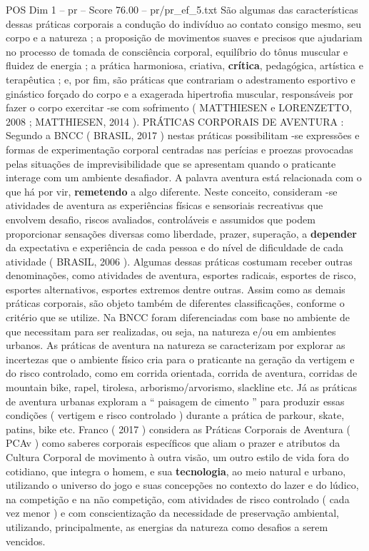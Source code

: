 \begin{textsample}{POS Dim 1 – pr – Score 76.00 – pr/pr\_ef\_5.txt}
São algumas das características dessas práticas corporais a condução do indivíduo ao contato consigo mesmo, seu corpo e a natureza ; a proposição de movimentos suaves e precisos que ajudariam no processo de tomada de consciência corporal, equilíbrio do tônus muscular e fluidez de energia ; a prática harmoniosa, criativa, \textbf{crítica}, pedagógica, artística e terapêutica ; e, por fim, são práticas que contrariam o adestramento esportivo e ginástico forçado do corpo e a exagerada hipertrofia muscular, responsáveis por fazer o corpo exercitar -se com sofrimento ( MATTHIESEN e LORENZETTO, 2008 ; MATTHIESEN, 2014 ).
PRÁTICAS CORPORAIS DE AVENTURA : Segundo a BNCC ( BRASIL, 2017 ) nestas práticas possibilitam -se expressões e formas de experimentação corporal centradas nas perícias e proezas provocadas pelas situações de imprevisibilidade que se apresentam quando o praticante interage com um ambiente desafiador.
A palavra aventura está relacionada com o que há por vir, \textbf{remetendo} a algo diferente.
Neste conceito, consideram -se atividades de aventura as experiências físicas e sensoriais recreativas que envolvem desafio, riscos avaliados, controláveis e assumidos que podem proporcionar sensações diversas como liberdade, prazer, superação, a \textbf{depender} da expectativa e experiência de cada pessoa e do nível de dificuldade de cada atividade ( BRASIL, 2006 ).
Algumas dessas práticas costumam receber outras denominações, como atividades de aventura, esportes radicais, esportes de risco, esportes alternativos, esportes extremos dentre outras.
Assim como as demais práticas corporais, são objeto também de diferentes classificações, conforme o critério que se utilize.
Na BNCC foram diferenciadas com base no ambiente de que necessitam para ser realizadas, ou seja, na natureza e/ou em ambientes urbanos.
As práticas de aventura na natureza se caracterizam por explorar as incertezas que o ambiente físico cria para o praticante na geração da vertigem e do risco controlado, como em corrida orientada, corrida de aventura, corridas de mountain bike, rapel, tirolesa, arborismo/arvorismo, slackline etc.
Já as práticas de aventura urbanas exploram a “ paisagem de cimento ” para produzir essas condições ( vertigem e risco controlado ) durante a prática de parkour, skate, patins, bike etc.
Franco ( 2017 ) considera as Práticas Corporais de Aventura ( PCAv ) como saberes corporais específicos que aliam o prazer e atributos da Cultura Corporal de movimento à outra visão, um outro estilo de vida fora do cotidiano, que integra o homem, e sua \textbf{tecnologia}, ao meio natural e urbano, utilizando o universo do jogo e suas concepções no contexto do lazer e do lúdico, na competição e na não competição, com atividades de risco controlado ( cada vez menor ) e com conscientização da necessidade de preservação ambiental, utilizando, principalmente, as energias da natureza como desafios a serem vencidos.

\end{textsample}
